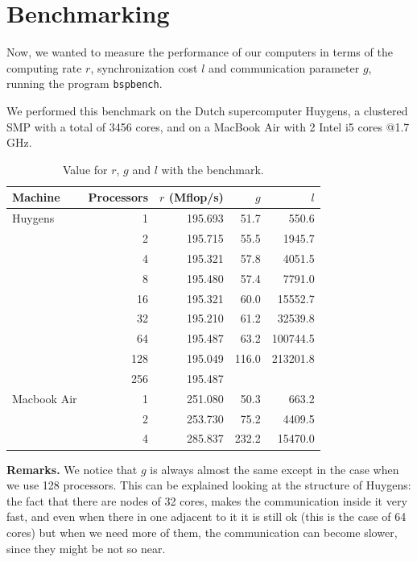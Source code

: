\documentclass[a4paper,11pt]{article}
\begin{document}
\section{Benchmarking}

Now, we wanted to measure the performance of our computers in terms of the computing rate $r$, synchronization cost $l$ and communication parameter $g$, running the program \texttt{bspbench}.

We performed this benchmark on the Dutch supercomputer Huygens, a clustered SMP with a total of 3456 cores, and on a MacBook Air with 2 Intel i5 cores @1.7 GHz.

\begin{table}[H]
\begin{center}
\begin{tabular}{|C{2.8cm}|r r r r|}
\hline
\textbf{Machine} & Processors & $r$ (Mflop/s) & $g$ & $l$ \\
\hline
Huygens & 1 & 195.693 & 51.7 & 550.6 \\
& 2 & 195.715 & 55.5 & 1945.7 \\
& 4 & 195.321 & 57.8 & 4051.5 \\
& 8 & 195.480 & 57.4 & 7791.0 \\
& 16 & 195.321 & 60.0 & 15552.7 \\
& 32 & 195.210 & 61.2 & 32539.8 \\
& 64 & 195.487 & 63.2 & 100744.5 \\
& 128 & 195.049 & 116.0 & 213201.8 \\
& 256 & 195.487 & & \\
\hline
Macbook Air & 1 &  251.080 & 50.3 & 663.2\\
& 2 & 253.730 & 75.2 & 4409.5\\
& 4 & 285.837 & 232.2 & 15470.0\\
\hline
\end{tabular}
\caption{Value for $r$, $g$ and $l$ with the benchmark.} \label{tab:bench}
\end{center}
\end{table}

\textbf{Remarks.} We notice that $g$ is always almost the same except in the case when we use 128 processors. This can be explained looking at the structure of Huygens: the fact that there are nodes of 32 cores, makes the communication inside it very fast, and even when there in one adjacent to it it is still ok (this is the case of 64 cores) but when we need more of them, the communication can become slower, since they might be not so near.
\end{document}
